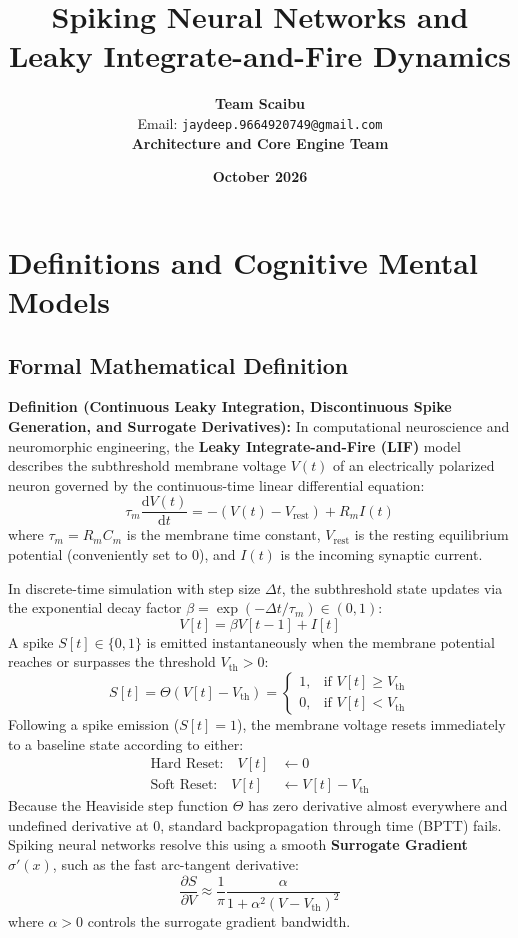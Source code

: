 \documentclass[11pt,a4paper]{article}
\title{\textbf{Spiking Neural Networks and Leaky Integrate-and-Fire Dynamics}}
\author{\textbf{Team Scaibu} \\ \small Email: \texttt{jaydeep.9664920749@gmail.com} \\ \small \textbf{Architecture and Core Engine Team}}
\date{\textbf{October 2026}}
\theoremstyle{definition}
\begin{document}
\maketitle

\section{Definitions and Cognitive Mental Models}

\subsection{Formal Mathematical Definition}
\textbf{Definition (Continuous Leaky Integration, Discontinuous Spike Generation, and Surrogate Derivatives):}
In computational neuroscience and neuromorphic engineering, the \textbf{Leaky Integrate-and-Fire (LIF)} model describes the subthreshold membrane voltage $V(t)$ of an electrically polarized neuron governed by the continuous-time linear differential equation:
{\boldmath
\begin{equation}
\tau_m \frac{\mathrm{d}V(t)}{\mathrm{d}t} = - (V(t) - V_{\text{rest}}) + R_m I(t)
\end{equation}
}
where $\tau_m = R_m C_m$ is the membrane time constant, $V_{\text{rest}}$ is the resting equilibrium potential (conveniently set to 0), and $I(t)$ is the incoming synaptic current.

In discrete-time simulation with step size $\Delta t$, the subthreshold state updates via the exponential decay factor $\beta = \exp(-\Delta t / \tau_m) \in (0, 1)$:
{\boldmath
\begin{equation}
V[t] = \beta V[t-1] + I[t]
\end{equation}
}
A spike $S[t] \in \{0, 1\}$ is emitted instantaneously when the membrane potential reaches or surpasses the threshold $V_{\text{th}} > 0$:
{\boldmath
\begin{equation}
S[t] = \Theta(V[t] - V_{\text{th}}) = 
\begin{cases}
1, & \text{if } V[t] \ge V_{\text{th}} \\
0, & \text{if } V[t] < V_{\text{th}}
\end{cases}
\end{equation}
}
Following a spike emission ($S[t] = 1$), the membrane voltage resets immediately to a baseline state according to either:
{\boldmath
\begin{align}
\text{Hard Reset:} \quad V[t] &\gets 0 \\
\text{Soft Reset:} \quad V[t] &\gets V[t] - V_{\text{th}}
\end{align}
}
Because the Heaviside step function $\Theta$ has zero derivative almost everywhere and undefined derivative at $0$, standard backpropagation through time (BPTT) fails. Spiking neural networks resolve this using a smooth \textbf{Surrogate Gradient} $\sigma'(x)$, such as the fast arc-tangent derivative:
{\boldmath
\begin{equation}
\frac{\partial S}{\partial V} \approx \frac{1}{\pi} \frac{\alpha}{1 + \alpha^2 (V - V_{\text{th}})^2}
\end{equation}
}
where $\alpha > 0$ controls the surrogate gradient bandwidth.
\end{document}

